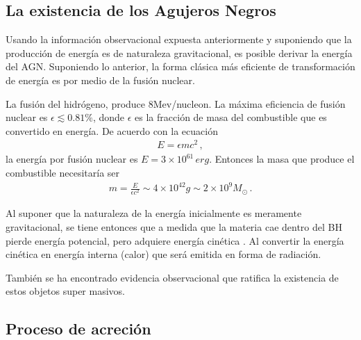 	\subsection{La existencia de los Agujeros Negros}
	\label{subsec:Why_a_BH}

Usando la información observacional expuesta anteriormente y suponiendo que la producción de energía es de naturaleza gravitacional, es posible derivar la energía del AGN. Suponiendo lo anterior, la forma clásica más eficiente de transformación de energía es por medio de la fusión nuclear. 

La fusión del hidrógeno, produce 8Mev/nucleon. La máxima eficiencia de fusión nuclear es $\epsilon \lesssim 0.81 \%$, donde $\epsilon$ es la fracción de masa del combustible que es convertido en energía. De acuerdo con la ecuación 
\begin{align}
E=\epsilon mc^{2}\,,
\end{align}
%
la energía por fusión nuclear es $E=3\times10^{61}\, erg$. Entonces la masa que produce el combustible necesitaría ser 
\begin{align}
m=\frac{E}{\epsilon c^{2}} \sim 4\times10^{42}g\sim 2\times10^{9}M_{\odot}\,.
\end{align}

Al suponer que la naturaleza de la energía inicialmente es meramente gravitacional, se tiene entonces que a medida que la materia cae dentro del BH pierde energía potencial, pero adquiere energía cinética . Al convertir la energía cinética en energía interna (calor) que será emitida en forma de radiación.

También se ha encontrado evidencia observacional que ratifica la existencia de estos objetos super masivos. 

	\subsection{Proceso de acreción}
	\label{subsec:Acretion}

